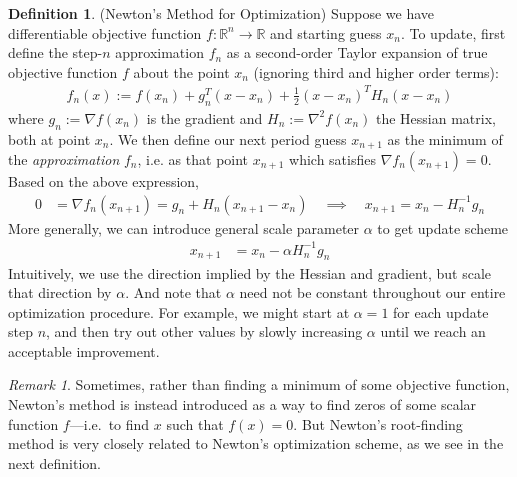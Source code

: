 \documentclass[12pt]{article}
\numberwithin{equation}{section} %
\theoremstyle{plain}
\theoremstyle{definition}
\newtheorem{defn}[thm]{Definition}
\theoremstyle{remark}
\newtheorem*{rmk}{Remark}
\newcommand{\ra}{\rightarrow}
\newcommand{\R}{\mathbb{R}}
\newcommand{\Rn}{\mathbb{R}^n}
\begin{document}
\begin{defn}(Newton's Method for Optimization)
\label{defn:newton}
Suppose we have differentiable objective function $f:\Rn\ra\R$ and
starting guess $x_n$.  To update, first define the step-$n$
approximation $f_n$ as a second-order Taylor expansion of true objective
function $f$ about the point $x_n$ (ignoring third and higher order
terms):
\begin{align}
  f_n(x)
  :=
  f(x_n)
  + g_n^T (x-x_n)
  + \frac{1}{2}(x-x_n)^T H_n(x-x_n)
  \label{eq:newtonapprox}
\end{align}
where $g_n:=\nabla f(x_n)$ is the gradient and $H_n:=\nabla^2 f(x_n)$
the Hessian matrix, both at point $x_n$.
We then define our next period guess $x_{n+1}$ as the minimum of the
\emph{approximation} $f_n$, i.e. as that point $x_{n+1}$ which satisfies
$\nabla f_n(x_{n+1})=0$. Based on the above expression,
\begin{align}
  0 &= \nabla f_n(x_{n+1})
  = g_n + H_n(x_{n+1}-x_n)
  \quad\implies\quad
  x_{n+1}
  =
  x_n-H_n^{-1}g_n
  \label{eq:newtonupdate1}
\end{align}
More generally, we can introduce general scale parameter $\alpha$ to get
update scheme
\begin{align}
  x_{n+1} &= x_n - \alpha H_n^{-1} g_n \label{eq:newtonupdate2}
\end{align}
Intuitively, we use the direction implied by the Hessian and
gradient, but scale that direction by $\alpha$.
And note that $\alpha$ need not be constant throughout our entire
optimization procedure.
For example, we might start at $\alpha=1$ for each update step $n$, and
then try out other values by slowly increasing $\alpha$ until we reach
an acceptable improvement.
\end{defn}

\begin{rmk}
Sometimes, rather than finding a minimum of some objective function,
Newton's method is instead introduced as a way to find zeros of some
scalar function $f$---i.e.\ to find $x$ such that $f(x)=0$.
But Newton's root-finding method is very closely related to Newton's
optimization scheme, as we see in the next definition.
\end{rmk}
\end{document}
